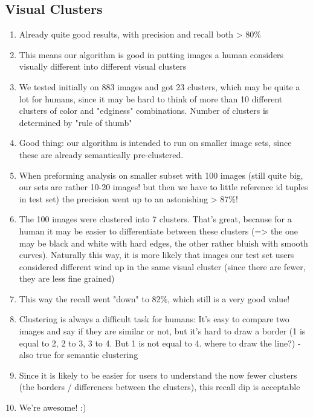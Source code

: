 \subsection{Visual Clusters}

\begin{enumerate}
\item Already quite good results, with precision and recall both > 80\%
\item This means our algorithm is good in putting images a human considers visually different into different visual clusters
\item We tested initially on 883 images and got 23 clusters, which may be quite a lot for humans, since it may be hard to think of more than 10 different clusters of color and "edginess" combinations. Number of clusters is determined by "rule of thumb"
\item Good thing: our algorithm is intended to run on smaller image sets, since these are already semantically pre-clustered.
\item When preforming analysis on smaller subset with 100 images (still quite big, our sets are rather 10-20 images! but then we have to little reference id tuples in test set) the precision went up to an astonishing > 87\%!
\item The 100 images were clustered into 7 clusters. That's great, because for a human it may be easier to differentiate between these clusters (=> the one may be black and white with hard edges, the other rather bluish with smooth curves). Naturally this way, it is more likely that images our test set users considered different wind up in the same visual cluster (since there are fewer, they are less fine grained)
\item This way the recall went "down" to 82\%, which still is a very good value!
\item Clustering is always a difficult task for humans: It's easy to compare two images and say if they are similar or not, but it's hard to draw a border (1 is equal to 2, 2 to 3, 3 to 4. But 1 is not equal to 4. where to draw the line?) - also true for semantic clustering
\item Since it is likely to be easier for users to understand the now fewer clusters (the borders / differences between the clusters), this recall dip is acceptable
\item We're awesome! :)
\end{enumerate}


